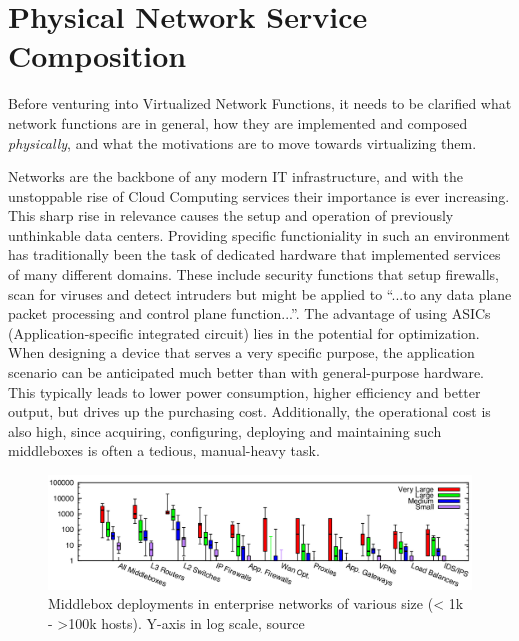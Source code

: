 \section{Physical Network Service Composition}
Before venturing into Virtualized Network Functions, it needs to be clarified what network functions are in general, how they are implemented and composed \textit{physically}, and what the motivations are to move towards virtualizing them. 

Networks are the backbone of any modern IT infrastructure, and with the unstoppable rise of  Cloud Computing services their importance is ever increasing. This sharp rise in relevance causes the setup and operation of previously unthinkable data centers. Providing specific functioniality in such an environment has traditionally been the task of dedicated hardware that implemented services of many different domains. These include security functions that setup firewalls, scan for viruses and detect intruders but might be applied to ``...to any data plane packet processing and control plane function...''\cite{nfv_wp}. The advantage of using ASICs (Application-specific integrated circuit) lies in the potential for optimization. When designing a device that serves a very specific purpose, the application scenario can be anticipated much better than with general-purpose hardware. This typically leads to lower power consumption, higher efficiency and better output, but drives up the purchasing cost. Additionally, the operational cost is also high, since acquiring, configuring, deploying and maintaining such middleboxes is often a tedious, manual-heavy task. 

\begin{figure}[H]
	\centering
	\includegraphics[width=1\linewidth]{images/middleboxesNumbers.png}
	\caption{Middlebox deployments in enterprise networks of various size (< 1k - >100k hosts). Y-axis in log scale, source \cite{sherry2016middleboxes}}
	\label{img:middleboxesNumbers}
\end{figure}

